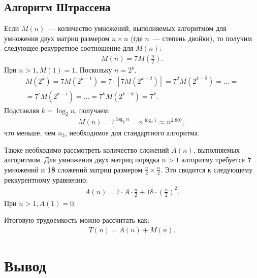 \subsection{Алгоритм Штрассена}
Если $M(n)$~--- количество умножений, выполняемых алгоритмом для умножения двух матриц размером $n \times n$ (где $n$~--- степень двойки), то получим следующее рекурретное соотношение для $M(n)$:
\begin{equation}
	\begin{gathered}
		M(n) = 7M(\frac{n}{2}).
	\end{gathered}
\end{equation}
При $n > 1, M(1) = 1$. Поскольку $n = 2^{k}$,
\begin{equation}
	\begin{gathered}
		M(2^{k}) = 7M(2^{k - 1}) = 7 \cdot [7M(2^{k - 2})] = 7^{2}M(2^{k - 2}) = \dots = \\ = 7^{i}M(2^{k - i}) = \dots = 7^{k}M(2^{k - k}) = 7^{k}.
	\end{gathered}
\end{equation}
Подставляя $k = \log_{2}n$, получаем:
\begin{equation}
	\begin{gathered}
		M(n) = 7^{\log_{2}n} = n^{\log_{2}7} \approx n^{2.807},
	\end{gathered}
\end{equation}
что меньше, чем $n_{3}$, необходимое для стандартного алгоритма.

Также необходимо рассмотреть количество сложений $A(n)$, выполняемых алгоритмом.
Для умножения двух матриц порядка $n > 1$ алгоритму требуется \textbf{7} умножений и \textbf{18} сложений матриц размером $\frac{n}{2} \times \frac{n}{2}$.
Это сводится к следующему реккурентному уравнению:
\begin{equation}
	\begin{gathered}
		A(n) = 7 \cdot A \cdot \frac{n}{2} + 18 \cdot (\frac{n}{2})^{2}.
	\end{gathered}
\end{equation}
При $ n > 1, A(1) = 0$.

Итоговую трудоемкость можно рассчитать как:
\begin{equation}
	\begin{gathered}
		T(n) = A(n) + M(n).
	\end{gathered}
\end{equation}

\section*{Вывод}

